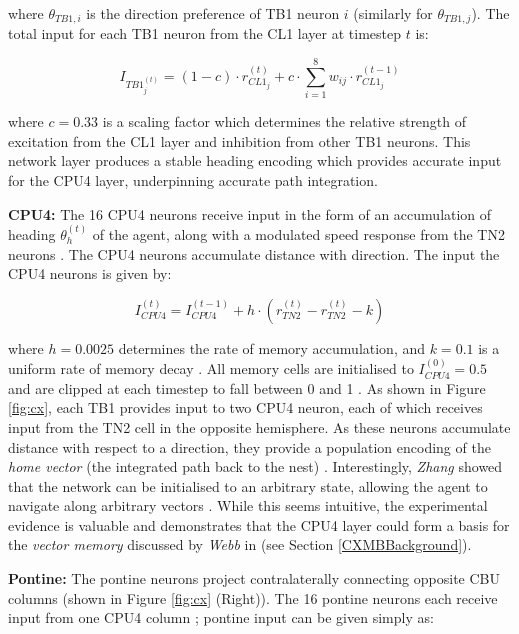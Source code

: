 \documentclass[a4paper,11pt,twoside,openright]{article}
\begin{document}
where $\theta_{TB1,i}$ is the direction preference of TB1 neuron $i$ (similarly
for $\theta_{TB1,j}$). The total input for each TB1 neuron from the CL1 layer
at timestep $t$ is:

\begin{equation}
  I_{TB1_{j}^{(t)}} =
  (1 - c) \cdot r_{CL1_j}^{(t)} + c \cdot \sum_{i = 1}^{8} w_{ij}
  \cdot r_{CL1_j}^{(t - 1)}
\end{equation}

where $c = 0.33$ is a scaling factor which determines the relative strength
of excitation from the CL1 layer and inhibition from other TB1 neurons. This
network layer produces a stable heading encoding which provides accurate
input for the CPU4 layer, underpinning accurate path integration.
\newline
\par

\textbf{CPU4:}
The 16 CPU4 neurons receive input in the form of an accumulation of
heading $\theta_h^{(t)}$ of the agent, along with a modulated speed response
from the TN2 neurons \cite{Stone2017}. The CPU4 neurons accumulate distance with
direction. The input the CPU4 neurons is given by:

\begin{equation}
I_{CPU4}^{(t)} = I_{CPU4}^{(t - 1)} + h \cdot (r_{TN2}^{(t)} - r_{TN2}^{(t)} - k)
\end{equation}

where $h = 0.0025$ determines the rate of memory accumulation, and $k = 0.1$ is
a uniform rate of memory decay \cite{Stone2017}. All memory cells are initialised
to $I_{CPU4}^{(0)} = 0.5$ and are clipped at each timestep to fall between 0 and
1 \cite{Stone2017}. As shown in Figure \ref{fig:cx}, each TB1 provides input to
two CPU4 neuron, each of which receives input from the TN2 cell in the opposite
hemisphere. As these neurons accumulate distance with respect to a direction,
they provide a population encoding of the \textit{home vector} (the integrated
path back to the nest) \cite{Stone2017}. Interestingly, \textit{Zhang} showed
that the network can be initialised to an arbitrary state, allowing the agent
to navigate along arbitrary vectors \cite{Zhang2017}. While this seems intuitive,
the experimental evidence is valuable and demonstrates that the CPU4 layer could
form a basis for the \textit{vector memory} discussed by \textit{Webb} in
\cite{Webb2018} (see Section \ref{CXMBBackground}).

\textbf{Pontine:}
The pontine neurons project contralaterally connecting opposite CBU columns
(shown in Figure \ref{fig:cx} (Right)). The 16 pontine neurons each receive input
from one CPU4 column \cite{Stone2017}; pontine input can be given simply as:
\end{document}

